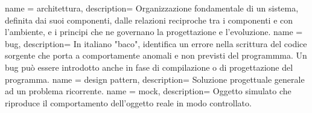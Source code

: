  {
  name = architettura,
  description={
		Organizzazione fondamentale di un sistema, definita dai suoi componenti, dalle relazioni reciproche tra i componenti e con l'ambiente, e i principi che ne governano la progettazione e l'evoluzione.
	}
}
 {
  name = bug,
  description={
		In italiano "baco", identifica un errore nella scrittura del codice sorgente che porta a comportamente anomali e non previsti del programmma. Un bug può essere introdotto anche in fase di compilazione o di progettazione del programma.
	}
}
 {
  name = design pattern,
  description={
		Soluzione progettuale generale ad un problema ricorrente.
	}
}
 {
  name = mock,
  description={
		Oggetto simulato che riproduce il comportamento dell'oggetto reale in modo controllato.
	}
}




